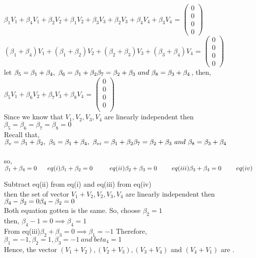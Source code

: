 \documentclass[45pt]{article}
\begin{document}
\begin{enumerate}
\begin{enumerate}
\begin{enumerate}
$\beta_1 V_1+\beta_4 V_1+\beta_2 V_2+ \beta_1 V_2+\beta_3 V_3+\beta_2 V_3+ \beta_4 V_4+ \beta_3 V_4$ =
$\begin{pmatrix}
0\\0\\0\\0
\end{pmatrix}$\\

$(\beta_1+\beta_4)V_1+(\beta_1+\beta_2)V_2+(\beta_2+\beta_3)V_3 +(\beta_3+\beta_4)V_4$ =
$\begin{pmatrix}
0\\0\\0\\0
\end{pmatrix}$\\

let $\beta_5=\beta_1+\beta_4,~\beta_6=\beta_1+\beta_2\\
\beta_7=\beta_2+\beta_3~ and ~\beta_8=\beta_3+\beta_4$, then,\\

$\beta_5 V_1+ \beta_6  V_2+\beta_7 V_3+ \beta_8 V_4$ =
$\begin{pmatrix}
0\\0\\0\\0\\
\end{pmatrix}$\\
Since we know that $V_1,V_2,V_3,V_4$ are linearly independent then \\ $\beta_5=\beta_6=\beta_7=\beta_8=0$\\
Recall that,
$\beta_v=\beta_1+\beta_2,~ \beta_5=\beta_1+\beta_4,~\beta_{vi}=\beta_1+\beta_2\\
\beta_7=\beta_2+\beta_3~ and ~\beta_8=\beta_3+\beta_4$\\\\
so, 
$\beta_1+\beta_4=0 ~ ~ ~ ~ ~eq(i) \\
\beta_1+\beta_2=0 ~ ~ ~ ~ ~ ~ ~ ~eq(ii)\\
\beta_2+\beta_3=0  ~ ~ ~ ~ ~ ~ ~ eq(iii)\\
\beta_3+\beta_4=0  ~ ~ ~ ~ ~ ~ ~eq(iv)$

Subtract eq(ii) from eq(i) and eq(iii) from eq(iv)\\
then the set of vector  {$V_1+V_2,V_2,V_3,V_4$} are linearly independent then 
$\beta_4 - \beta_2=0\\
\beta_4-\beta_2=0$\\
Both equation gotten is the same. So, choose $\beta_2 = 1$\\
then, $\beta_4-1=0 \implies \beta_4=1$\\
 From eq(iii)$\beta_2+\beta_3=0 \implies \beta_1=-1$
 Therefore, $\beta_1=-1, \beta_2=1, \beta_3=-1 ~and ~beta_4=1$\\
 Hence, the vector $(V_1+V_2),(V_2+V_3),(V_3+V_4)$ and $(V_4+V_1)$ are .
\end{enumerate}
\end{enumerate}
\end{enumerate}
\end{document}
